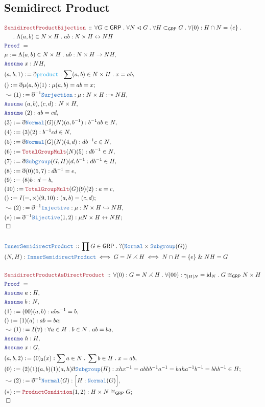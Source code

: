 \documentclass[12pt]{scrartcl}
\newcommand{\TYPE}[1]{\textcolor{NavyBlue}{\mathtt{#1}}}
\newcommand{\FUNC}[1]{\textcolor{Cerulean}{\mathtt{#1}}}
\newcommand{\LOGIC}[1]{\textcolor{Blue}{\mathtt{#1}}}
\newcommand{\THM}[1]{\textcolor{Maroon}{\mathtt{#1}}}
\renewcommand{\.}{\; . \;}
\newcommand{\de}{: \kern 0.1pc =}
\newcommand{\Theorem}[2]{& \THM{#1} \, :: \, #2 \\ & \Proof = \\ }
\newcommand{\DeclareType}[2]{& \TYPE{#1} \, :: \, #2 \\}
\newcommand{\DefineNamedType}[4]{& #1 : \TYPE{#2} \iff #3 \iff #4 \\}
\newcommand{\NewLine}{\\ & \kern 1pc}
\newcommand{\Page}[1]{ \begin{align*} #1 \end{align*}   }
\newcommand{ \bd }{ \ByDef }
\renewcommand{\And}{\; \& \;}
\DeclareMathOperator*{\id}{id}
\newcommand{\ToInj}{\hookrightarrow}
\newcommand{\ToSurj}{\twoheadrightarrow}
\newcommand{\ToBij}{\leftrightarrow}
\newcommand{\Say}[3]{& #1 \de #2 : #3, \\}
\newcommand{\Conclude}[3]{& #1 \de #2 : #3; \\}
\newcommand{\Derive}[3]{& \leadsto #1 \de #2 : #3, \\}
\newcommand{\Assume}[2]{& \LOGIC{Assume} \; #1 : #2, \\}
\newcommand{\QED}{\; \square}
\newcommand{\EndProof}{& \QED \\}
\newcommand{\ByDef}{\eth}
\newcommand{\Proof}{\LOGIC{Proof} \; }
\newcommand{\Sgrp}{\subset_{\mathsf{GRP}}}
\newcommand{\Nrml}{\vartriangleleft}
\newcommand{\GRP}{\mathsf{GRP}}
\newcommand{\SDP}{\rightthreetimes}
\begin{document}
\subsection{Semidirect Product}
\Page{   
	\Theorem{SemidirectProductBijection}{
			\forall  G \in \GRP \. \forall N \Nrml G \. \forall H \Sgrp G \.   \forall (0) : H \cap N = \{e\} \.  
			\NewLine \. \Lambda (a,b) \in N \times H \. ab : N \times H \ToBij NH
		}
	\Say{\mu}{\Lambda (a,b) \in N \times H \. ab }{N \times H \to NH}
	\Assume{x}{NH}
	\Say{(a,b,1)}{\bd \FUNC{product}}{\sum (a,b) \in N \times H \. x = ab }
	\Conclude{()}{\bd \mu (a,b)(1)}{\mu(a,b)= ab = x}
	\Derive{(1)}{\bd^{-1} \TYPE{Surjection}}{ \mu : N \times H : \ToSurj NH }
	\Assume{(a,b),(c,d)}{N \times H}
	\Assume{(2)}{ab = cd}
	\Say{(3)}{\bd \TYPE{Normal}(G)(N)(a,b^{-1})}{b^{-1}ab \in N}
	\Say{(4)}{(3)(2)}{b^{-1}cd \in N}
	\Say{(5)}{\bd \TYPE{Normal}(G)(N)(4,d) }{ db^{-1}c \in N  }
	\Say{(6)}{\THM{TotalGroupMult}(N)(5)}{ db^{-1} \in N   }
	\Say{(7)}{\bd \TYPE{Subgroup}(G,H)(d,b^{-1}}{db^{-1} \in H}
	\Say{(8)}{ \bd (0)(5,7) }{ db^{-1} = e  }
	\Say{(9)}{ (8)b }{  d = b   }
	\Say{(10)}{\THM{TotalGroupMult}(G)(9)(2)}{a = c}
	\Conclude{()}{ I(=,\times)(9,10)}{ (a,b) = (c,d)}
	\Derive{(2)}{\bd^{-1} \TYPE{Injective}}{\mu : N \times H \ToInj NH  }
	\Conclude{(*)}{\bd^{-1}\TYPE{Bijective}(1,2)}{\mu N \times H \ToBij NH}
	\EndProof
	\\
	\DeclareType{InnerSemidirectProduct}{  \prod G \in \GRP \. ?(\TYPE{Normal} \times \TYPE{Subgroup}(G))  }
	\DefineNamedType{(N,H)}{InnerSemidirectProduct}{G = N \SDP H}{N \cap H = \{e\} \And  NH = G}
	\\
	\Theorem{SemidirectProductAsDirectProduct}{\forall (0) : G = N \SDP H \. \forall (00) : \gamma_{|H|N} = {\id}_{N} \.  G \cong_\GRP N \times H}
	\Assume{a}{H}
	\Assume{b}{N}
	\Say{(1)}{ (00)(a,b) }{aba^{-1} = b}
	\Conclude{()}{ (1)(a)  }{ab = ba}
	\Derive{(1)}{ I(\forall)  }{ \forall a \in H \. b \in N \. ab = ba }
	\Assume{h}{H}
	\Assume{x}{G}
	\Say{(a,b,2)}{(0)_2(x)}{\sum a \in N \. \sum b \in H \. x = ab}
	\Conclude{(0)}{(2)(1)(a,b)(1)(a,h) \bd \TYPE{Subgroup}(H) }{ xhx^{-1} = abhb^{-1}a^{-1} = baha^{-1}b^{-1} = bhb^{-1} \in H}
	\Derive{(2)}{\bd^{-1} \TYPE{Normal}(G) }{ \Big[ H : \TYPE{Normal}(G) \Big] }
	\Conclude{(*)}{\THM{ProductCondition}(1,2)}{  H \times N \cong_{\GRP} G  }
	\EndProof
}
\end{document}
